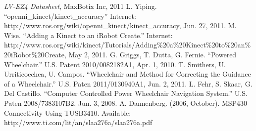 \documentclass[oneside,final]{report}
\begin{document}
\begin{thebibliography}{9}


   \emph{LV-EZ4 Datasheet}, MaxBotix Inc, 2011
L. Yiping. “openni\_kinect/kinect\_accuracy” Internet: http://www.ros.org/wiki/openni\_kinect/kinect\_accuracy, Jun. 27, 2011.
	M. Wise. “Adding a Kinect to an iRobot Create.” Internet: http://www.ros.org/wiki/kinect/Tutorials/Adding\%20a\%20Kinect\%20to\%20an\%20iRobot\%20Create, May 2, 2011.
	G. Griggs, T. Dutta, G. Fernie. “Powered Wheelchair.” U.S. Patent 2010/0082182A1, Apr. 1, 2010.
	T. Smithers, U. Urriticoechea, U. Campos. “Wheelchair and Method for Correcting the Guidance of a Wheelchair.” U.S. Paten 2011/0130940A1, Jun. 2, 2011.
	L. Fehr, S. Skaar, G. Del Castillo. “Computer Controlled Power Wheelchair Navigation System.” U.S. Paten 2008/7383107B2, Jun. 3, 2008.
	A. Dannenberg. (2006, October). MSP430 Connectivity Using TUSB3410. Available: http://www.ti.com/lit/an/slaa276a/slaa276a.pdf
\end{thebibliography}
\end{document}
